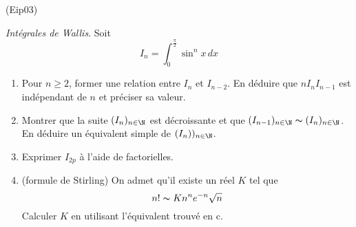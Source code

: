 \begin{tiny}(Eip03)\end{tiny} \emph{Int{\'e}grales de Wallis}.\newline
Soit
\begin{displaymath}
 I_{n}=\int_{0}^{\frac{\pi }{2}}\sin ^{n}x\,dx
\end{displaymath}
\begin{enumerate}
\item  Pour $n\geq 2$, former une relation entre $I_n$ et $I_{n-2}$. En déduire que $nI_{n}I_{n-1}$ est ind{\'e}pendant de $n$ et pr{\'e}ciser sa valeur.
\item  Montrer que la suite $(I_{n})_{n\in \N}$ est décroissante et que $(I_{n-1})_{n\in \N}\thicksim (I_{n})_{n\in \N}$. En d{\'e}duire un {\'e}quivalent simple de $(I_{n}))_{n\in \N}$.
\item  Exprimer $I_{2p}$ {\`a} l'aide de factorielles.
\item (formule de Stirling) On admet qu'il existe un réel $K$ tel que
\begin{displaymath}
 n! \thicksim K n^n e^{-n}\sqrt{n}
\end{displaymath}
Calculer $K$ en utilisant l'équivalent trouvé en c.
\end{enumerate}
